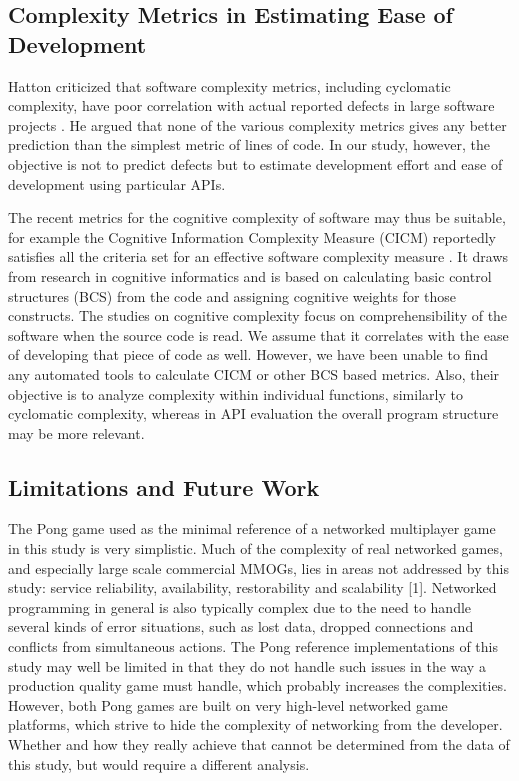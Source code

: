 \documentclass[conference]{IEEEtran}
\begin{document}
\subsection{Complexity Metrics in Estimating Ease of Development}

Hatton criticized that software complexity metrics, including
cyclomatic complexity, have poor correlation with actual reported
defects in large software projects \cite{hatton}. He argued that none
of the various complexity metrics gives any better prediction than the
simplest metric of lines of code. In our study, however, the objective
is not to predict defects but to estimate development effort and ease
of development using particular APIs.

The recent metrics for the cognitive complexity of software may thus
be suitable, for example the Cognitive Information Complexity Measure
(CICM) reportedly satisfies all the criteria set for an effective
software complexity measure \cite{cicm}. It draws from research in
cognitive informatics and is based on calculating basic control
structures (BCS) from the code and assigning cognitive weights for
those constructs. The studies on cognitive complexity focus on
comprehensibility of the software when the source code is read. We
assume that it correlates with the ease of developing that piece of
code as well. However, we have been unable to find any automated tools
to calculate CICM or other BCS based metrics. Also, their objective is
to analyze complexity within individual functions, similarly to
cyclomatic complexity, whereas in API evaluation the overall program
structure may be more relevant.

\subsection{Limitations and Future Work}

The Pong game used as the minimal reference of a networked multiplayer
game in this study is very simplistic. Much of the complexity of real
networked games, and especially large scale commercial MMOGs, lies in
areas not addressed by this study: service reliability, availability,
restorability and scalability [1]. Networked programming in general is
also typically complex due to the need to handle several kinds of
error situations, such as lost data, dropped connections and conflicts
from simultaneous actions. The Pong reference implementations of this
study may well be limited in that they do not handle such issues in
the way a production quality game must handle, which probably
increases the complexities. However, both Pong games are built on very
high-level networked game platforms, which strive to hide the
complexity of networking from the developer. Whether and how they
really achieve that cannot be determined from the data of this study,
but would require a different analysis.
\end{document}
